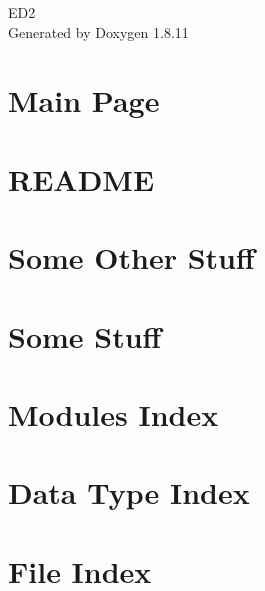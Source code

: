 \documentclass[twoside]{book}
\newcommand{\+}{\discretionary{\mbox{\scriptsize$\hookleftarrow$}}{}{}}
\newcommand{\clearemptydoublepage}{%
  \newpage{\pagestyle{empty}\cleardoublepage}%
}
\begin{document}
\hypersetup{pageanchor=false,
             bookmarksnumbered=true,
             pdfencoding=unicode
            }
\begin{titlepage}
\vspace*{7cm}
\begin{center}%
{\Large E\+D2 }\\
\vspace*{1cm}
{\large Generated by Doxygen 1.8.11}\\
\end{center}
\end{titlepage}
\clearemptydoublepage
\tableofcontents
\clearemptydoublepage
{}
\hypersetup{pageanchor=true}

\chapter{Main Page}
\label{index}\hypertarget{index}{}
\chapter{R\+E\+A\+D\+ME}
\label{md_README}
\hypertarget{md_README}{}

\chapter{Some Other Stuff}
\label{md_Doc_custom_Some_Other_Stuff}
\hypertarget{md_Doc_custom_Some_Other_Stuff}{}

\chapter{Some Stuff}
\label{md_Doc_custom_Some_Stuff}
\hypertarget{md_Doc_custom_Some_Stuff}{}

\chapter{Modules Index}

\chapter{Data Type Index}

\chapter{File Index}

\end{document}
